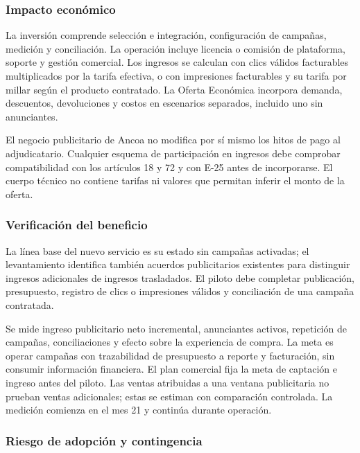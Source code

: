 \documentclass[11pt]{article}
\begin{document}
\subsubsection{Impacto económico}\label{impacto-econuxf3mico-3}

La inversión comprende selección e integración, configuración de campañas, medición y conciliación. La operación incluye licencia o comisión de plataforma, soporte y gestión comercial. Los ingresos se calculan con clics válidos facturables multiplicados por la tarifa efectiva, o con impresiones facturables y su tarifa por millar según el producto contratado. La Oferta Económica incorpora demanda, descuentos, devoluciones y costos en escenarios separados, incluido uno sin anunciantes.

El negocio publicitario de Ancoa no modifica por sí mismo los hitos de pago al adjudicatario. Cualquier esquema de participación en ingresos debe comprobar compatibilidad con los artículos 18 y 72 y con E-25 antes de incorporarse. El cuerpo técnico no contiene tarifas ni valores que permitan inferir el monto de la oferta.

\subsubsection{Verificación del beneficio}\label{verificaciuxf3n-del-beneficio-3}

La línea base del nuevo servicio es su estado sin campañas activadas; el levantamiento identifica también acuerdos publicitarios existentes para distinguir ingresos adicionales de ingresos trasladados. El piloto debe completar publicación, presupuesto, registro de clics o impresiones válidos y conciliación de una campaña contratada.

Se mide ingreso publicitario neto incremental, anunciantes activos, repetición de campañas, conciliaciones y efecto sobre la experiencia de compra. La meta es operar campañas con trazabilidad de presupuesto a reporte y facturación, sin consumir información financiera. El plan comercial fija la meta de captación e ingreso antes del piloto. Las ventas atribuidas a una ventana publicitaria no prueban ventas adicionales; estas se estiman con comparación controlada. La medición comienza en el mes 21 y continúa durante operación.

\subsubsection{Riesgo de adopción y contingencia}\label{riesgo-de-adopciuxf3n-y-contingencia-3}
\end{document}

